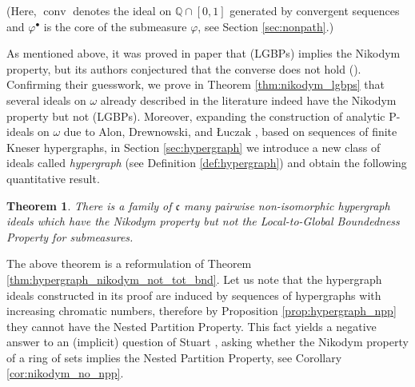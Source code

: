 \documentclass[a4paper,11pt,fleqn]{amsart}
\newtheorem{theoreml}{Theorem}[section]
\theoremstyle{definition}
\theoremstyle{remark}
\numberwithin{equation}{section}
\newcommand{\frakc}{\mathfrak{c}}
\newcommand{\Q}{\mathbb{Q}}
\DeclareMathOperator{\conv}{{conv}}
\begin{document}
\vspace{1mm}
(Here, $\conv$ denotes the ideal on $\Q\cap[0,1]$ generated by convergent sequences and $\varphi^\bullet$ is the core of the submeasure $\varphi$, see Section \ref{sec:nonpath}.)

As mentioned above, it was proved in paper \cite{DFP96} that (LGBPs) implies the Nikodym property, but its authors conjectured that the converse does not hold (\cite[Conjecture on page 147]{DFP96}). Confirming their guesswork, we prove in Theorem \ref{thm:nikodym_lgbps} that several ideals on $\omega$ already described in the literature indeed have the Nikodym property but not (LGBPs). Moreover, expanding the construction of analytic P-ideals on $\omega$ due to Alon, Drewnowski, and \L uczak \cite{ADL09}, based on  sequences of finite Kneser hypergraphs, in Section \ref{sec:hypergraph} we introduce a new class of ideals called \textit{hypergraph} (see Definition \ref{def:hypergraph}) and obtain the following quantitative result.

\begin{theoreml}\label{thm:main_hypergraphs}
    There is a family of $\frakc$ many pairwise non-isomorphic hypergraph ideals which have the Nikodym property but not the Local-to-Global Boundedness Property for submeasures.   
\end{theoreml}

The above theorem is a reformulation of Theorem \ref{thm:hypergraph_nikodym_not_tot_bnd}. Let us note that the hypergraph ideals constructed in its proof are induced by sequences of hypergraphs with increasing chromatic numbers, therefore by Proposition \ref{prop:hypergraph_npp} they cannot have the Nested Partition Property. This fact yields a negative answer to an (implicit) question of Stuart \cite[page 153]{Stu07}, asking whether the Nikodym property of a ring of sets implies the Nested Partition Property, see Corollary \ref{cor:nikodym_no_npp}. 
\end{document}
